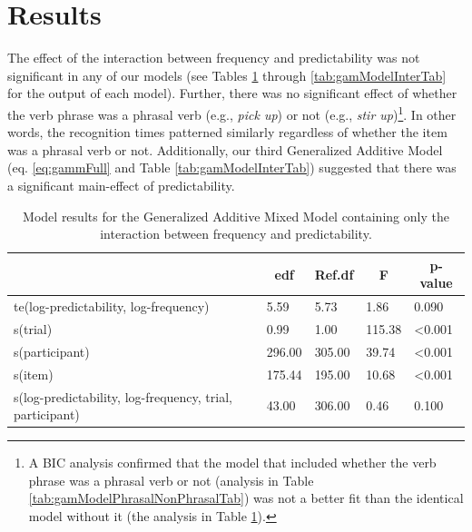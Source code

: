 \documentclass[
  man,floatsintext]{apa6}
\begin{document}
\hypertarget{results}{%
\section{Results}\label{results}}

The effect of the interaction between frequency and predictability was not significant in any of our models (see Tables \ref{tab:gamModelTab} through \ref{tab:gamModelInterTab} for the output of each model). Further, there was no significant effect of whether the verb phrase was a phrasal verb (e.g., \emph{pick up}) or not (e.g., \emph{stir up})\footnote{A BIC analysis confirmed that the model that included whether the verb phrase was a phrasal verb or not (analysis in Table \ref{tab:gamModelPhrasalNonPhrasalTab}) was not a better fit than the identical model without it (the analysis in Table \ref{tab:gamModelTab}).}. In other words, the recognition times patterned similarly regardless of whether the item was a phrasal verb or not. Additionally, our third Generalized Additive Model (eq. \ref{eq:gammFull} and Table \ref{tab:gamModelInterTab}) suggested that there was a significant main-effect of predictability.

\begin{table}[H]

\begin{center}
\begin{threeparttable}

\caption{\label{tab:gamModelTab}Model results for the Generalized Additive Mixed Model containing only the interaction between frequency and predictability.}

\begin{tabular}{lllll}
\toprule
 & \multicolumn{1}{c}{edf} & \multicolumn{1}{c}{Ref.df} & \multicolumn{1}{c}{F} & \multicolumn{1}{c}{p-value}\\
\midrule
te(log-predictability, log-frequency) & 5.59 & 5.73 & 1.86 & 0.090\\
s(trial) & 0.99 & 1.00 & 115.38 & <0.001\\
s(participant) & 296.00 & 305.00 & 39.74 & <0.001\\
s(item) & 175.44 & 195.00 & 10.68 & <0.001\\
s(log-predictability, log-frequency, trial, participant) & 43.00 & 306.00 & 0.46 & 0.100\\
\bottomrule
\end{tabular}

\end{threeparttable}
\end{center}

\end{table}
\end{document}
